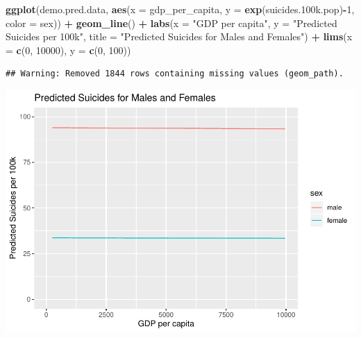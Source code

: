 \documentclass[11pt,]{article}
\newenvironment{Shaded}{\begin{snugshade}}{\end{snugshade}}
\newcommand{\CommentTok}[1]{\textcolor[rgb]{0.56,0.35,0.01}{\textit{#1}}}
\newcommand{\DataTypeTok}[1]{\textcolor[rgb]{0.13,0.29,0.53}{#1}}
\newcommand{\DecValTok}[1]{\textcolor[rgb]{0.00,0.00,0.81}{#1}}
\newcommand{\FloatTok}[1]{\textcolor[rgb]{0.00,0.00,0.81}{#1}}
\newcommand{\KeywordTok}[1]{\textcolor[rgb]{0.13,0.29,0.53}{\textbf{#1}}}
\newcommand{\NormalTok}[1]{#1}
\newcommand{\OperatorTok}[1]{\textcolor[rgb]{0.81,0.36,0.00}{\textbf{#1}}}
\newcommand{\OtherTok}[1]{\textcolor[rgb]{0.56,0.35,0.01}{#1}}
\newcommand{\StringTok}[1]{\textcolor[rgb]{0.31,0.60,0.02}{#1}}
\begin{document}
\begin{Shaded}
\begin{Highlighting}[]
\KeywordTok{ggplot}\NormalTok{(demo.pred.data, }\KeywordTok{aes}\NormalTok{(}\DataTypeTok{x =}\NormalTok{ gdp_per_capita, }\DataTypeTok{y =} \KeywordTok{exp}\NormalTok{(suicides}\FloatTok{.100}\NormalTok{k.pop)}\OperatorTok{-}\DecValTok{1}\NormalTok{, }\DataTypeTok{color =}\NormalTok{ sex)) }\OperatorTok{+}\StringTok{ }
\StringTok{  }\KeywordTok{geom_line}\NormalTok{() }\OperatorTok{+}\StringTok{ }
\StringTok{  }\KeywordTok{labs}\NormalTok{(}\DataTypeTok{x =} \StringTok{"GDP per capita"}\NormalTok{, }\DataTypeTok{y =} \StringTok{"Predicted Suicides per 100k"}\NormalTok{, }\DataTypeTok{title =} \StringTok{"Predicted Suicides for Males and Females"}\NormalTok{) }\OperatorTok{+}
\StringTok{  }\KeywordTok{lims}\NormalTok{(}\DataTypeTok{x =} \KeywordTok{c}\NormalTok{(}\DecValTok{0}\NormalTok{, }\DecValTok{10000}\NormalTok{), }\DataTypeTok{y =} \KeywordTok{c}\NormalTok{(}\DecValTok{0}\NormalTok{, }\DecValTok{100}\NormalTok{))}
\end{Highlighting}
\end{Shaded}

\begin{verbatim}
## Warning: Removed 1844 rows containing missing values (geom_path).
\end{verbatim}

\includegraphics{An-Analysis-of-Suicide-Data_files/figure-latex/unnamed-chunk-2-7.pdf}

\begin{Shaded}
\end{Shaded}
\end{document}
